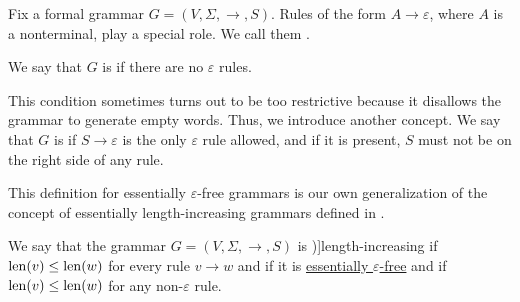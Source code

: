 \begin{definition}\label{def:epsilon_free_grammar}
  Fix a formal grammar \( G = (V, \Sigma, \to, S) \). Rules of the form \( A \to \varepsilon \), where \( A \) is a nonterminal, play a special role. We call them .

  We say that \( G \) is  if there are no \( \varepsilon \) rules.

  This condition sometimes turns out to be too restrictive because it disallows the grammar to generate empty words. Thus, we introduce another concept. We say that \( G \) is  if \( S \to \varepsilon \) is the only \( \varepsilon \) rule allowed, and if it is present, \( S \) must not be on the right side of any rule.
\end{definition}
\begin{comments}
  \item This definition for essentially \( \varepsilon \)-free grammars is our own generalization of the concept of essentially length-increasing grammars defined in .
\end{comments}

\begin{definition}\label{def:length_increasing_grammar}
  We say that the grammar \( G = (V, \Sigma, \to, S) \) is \term[ru=неукорачивающая (граматика) (\cite[83]{Гладкий1973Языки})]{length-increasing} if \( \operatorname{len}(v) \leq \operatorname{len}(w) \) for every rule \( v \to w \) and  if it is \hyperref[def:epsilon_free_grammar]{essentially \( \varepsilon \)-free} and if \( \operatorname{len}(v) \leq \operatorname{len}(w) \) for any non-\( \varepsilon \) rule.
\end{definition}

